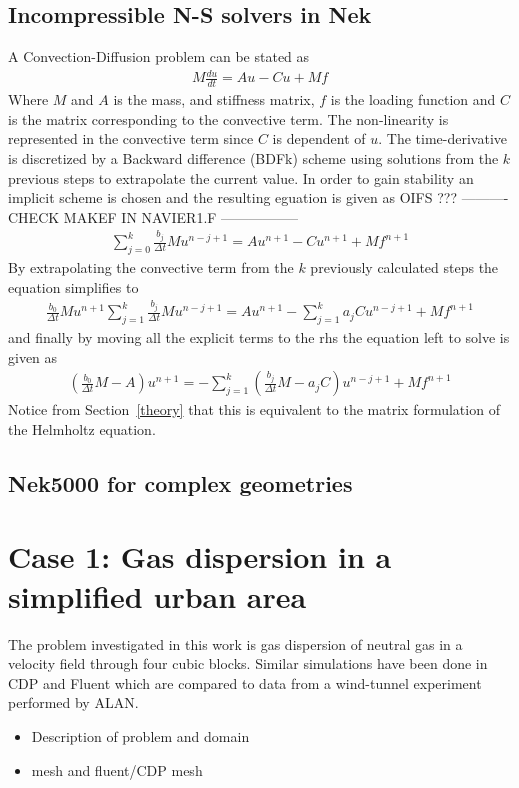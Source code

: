 \subsection{Incompressible N-S solvers in Nek}
A Convection-Diffusion problem can be stated as 
\begin{align}
    M\frac{du}{dt} = Au-Cu+Mf
    \label{eq:conv-diff}
\end{align}
% 
Where $M$ and $A$ is the mass, and stiffness matrix, $f$ is the loading function and $C$ is 
the matrix corresponding to the convective term. The non-linearity is represented in the 
convective term since $C$ is dependent of $u$.
The time-derivative is discretized by a Backward difference (BDFk) scheme using solutions 
from the $k$ previous steps to extrapolate the current value. In order to gain stability 
an implicit scheme is chosen and the resulting eguation is given as 
%
OIFS ???
---------- CHECK MAKEF IN NAVIER1.F ----------------- 
\begin{align}
    \sum_{j=0}^{k}\frac{b_j}{\Delta t}Mu^{n-j+1} = Au^{n+1}-Cu^{n+1}+Mf^{n+1}
    \label{eq:conv-diff2}
\end{align}
% 
By extrapolating the convective term from the $k$ previously calculated steps the equation 
simplifies to 
%
\begin{align}
   \frac{b_0}{\Delta t}Mu^{n+1} \sum_{j=1}^{k}\frac{b_j}{\Delta t}Mu^{n-j+1} 
   = Au^{n+1}-\sum_{j=1}^{k}a_jCu^{n-j+1}+Mf^{n+1}
    \label{eq:conv-diff3}
\end{align}
% 
and finally by moving all the explicit terms to the rhs the equation left to solve is given as 
%
\begin{align}
   (\frac{b_0}{\Delta t}M-A)u^{n+1} 
   = -\sum_{j=1}^{k}(\frac{b_j}{\Delta t}M-a_jC)u^{n-j+1}+Mf^{n+1}
    \label{eq:conv-diff4}
\end{align}
% 
Notice from Section~\ref{theory} that this is equivalent to the matrix formulation of 
the Helmholtz equation.



\subsection{Nek5000 for complex geometries}

\section{Case 1: Gas dispersion in a simplified urban area}
The problem investigated in this work is gas dispersion of neutral gas in a velocity field through four cubic blocks.
Similar simulations have been done in CDP and Fluent which are compared to data from a wind-tunnel experiment performed by ALAN.
\begin{itemize}
	\item Description of problem and domain
	\item mesh and fluent/CDP mesh
\end{itemize}

